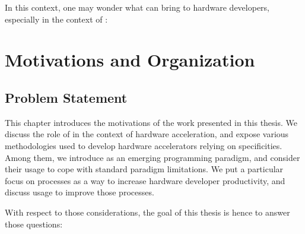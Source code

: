         In this context, one may wonder what can  bring to hardware developers, especially in the context of :


\section{Motivations and Organization}
\label{ch.problem:sec.synthesis}

    \subsection{Problem Statement}
    \label{ch.problem:sec.synthesis:ssec.summary}

        This chapter introduces the motivations of the work presented in this thesis.
        We discuss the role of  in the context of hardware acceleration, and expose various methodologies used to develop hardware accelerators relying on  specificities.
        Among them, we introduce  as an emerging programming paradigm, and consider their usage to cope with standard paradigm limitations.
        We put a particular focus on  processes as a way to increase hardware developer productivity, and discuss  usage to improve those processes.

\clearpage
        With respect to those considerations, the goal of this thesis is hence to answer those questions:

